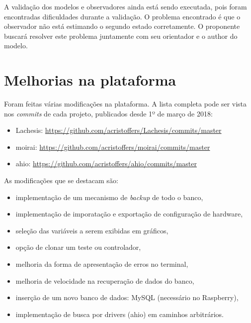 A validação dos modelos e observadores ainda está sendo executada, pois foram
encontradas dificuldades durante a validação. O problema encontrado é que o
observador não está estimando o segundo estado corretamente. O proponente
buscará resolver este problema juntamente com seu orientador e o author do
modelo.

\section{Melhorias na plataforma}%
\label{sec:platform-enhancements}

Foram feitas várias modificações na plataforma. A lista completa pode ser vista
nos \textit{commits} de cada projeto, publicados desde 1º de março de 2018:

\begin{itemize}
    \item Lachesis: \url{https://github.com/acristoffers/Lachesis/commits/master}
    \item moirai: \url{https://github.com/acristoffers/moirai/commits/master}
    \item ahio: \url{https://github.com/acristoffers/ahio/commits/master}
\end{itemize}

As modificações que se destacam são:

\begin{itemize}
    \item implementação de um mecanismo de \textit{backup} de todo o banco,
    \item implementação de imporatação e exportação de configuração de hardware,
    \item seleção das variáveis a serem exibidas em gráficos,
    \item opção de clonar um teste ou controlador,
    \item melhoria da forma de apresentação de erros no terminal,
    \item melhoria de velocidade na recuperação de dados do banco,
    \item inserção de um novo banco de dados: MySQL (necessário no Raspberry),
    \item implementação de busca por drivers (ahio) em caminhos arbitrários.
\end{itemize}

